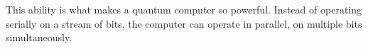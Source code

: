 \documentclass[10pt,journal,compsoc]{IEEEtran}
\begin{document}

This ability is what makes a quantum computer so powerful. Instead of operating serially on a stream of bits, the computer can operate in parallel, on multiple bits simultaneously. 

%
%



%
%
\end{document}
